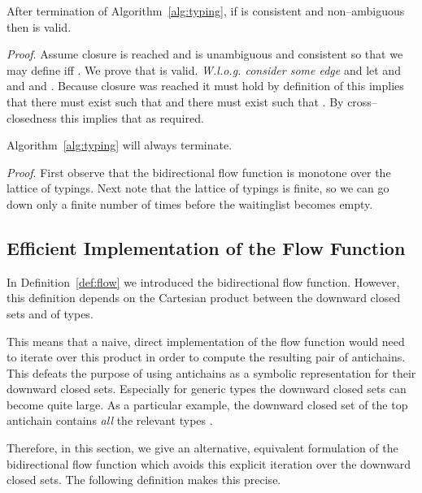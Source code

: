 \documentclass{sigplanconf}
\begin{document}
\begin{samepage}
\begin{theorem}[Soundness]
After termination of Algorithm~\ref{alg:typing}, if  is
consistent and non--ambiguous then  is valid.
\end{theorem}
\emph{Proof}.
Assume closure is reached and  is unambiguous and consistent
so that we may define  iff . We
prove that  is valid. \emph{W.l.o.g. consider some edge}  and let  and  and  and . Because closure was reached
it must hold  by definition of 
this implies that there must exist  such that  and there must exist  such that . By cross--closedness this implies that  as
required. 
\end{samepage}

\begin{samepage}
\begin{theorem}[Termination]
Algorithm~\ref{alg:typing} will always terminate.
\end{theorem}
\emph{Proof}. First observe that the bidirectional flow function
 is monotone over the lattice of typings. Next note that the
lattice  of typings is finite, so we can go down only a
finite number of times before the waitinglist becomes empty. 
\end{samepage}

\subsection{Efficient Implementation of the Flow Function}\label{sec:efficient}

In Definition~\ref{def:flow} we introduced the bidirectional flow
function. However, this definition depends on the Cartesian product
between the downward closed sets  and  of types.

This means that a naive, direct implementation of the flow function
would need to iterate over this product in order to compute the
resulting pair of antichains. This defeats the purpose of using
antichains as a symbolic representation for their downward closed
sets. Especially for generic types the downward closed sets can become
quite large. As a particular example, the downward closed set of the
top antichain  contains \emph{all} the
relevant types .

Therefore, in this section, we give an alternative, equivalent
formulation of the bidirectional flow function which avoids this
explicit iteration over the downward closed sets. The following
definition makes this precise.
\end{document}
